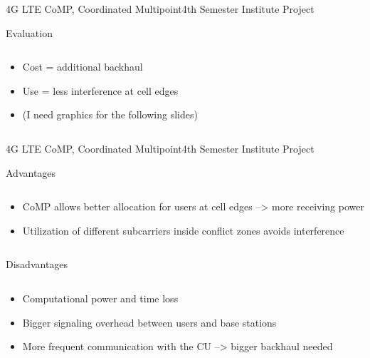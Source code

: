\documentclass[xcolor={cmyk}]{beamer}
\begin{document}
 \begin{frame}{4G LTE CoMP, Coordinated Multipoint}{4th Semester Institute Project}
	 \begin{block}{Evaluation}
	 	\begin{columns}
			\begin{column}{.9\textwidth}
				\begin{itemize}
					\item Cost = additional backhaul
					\item Use = less interference at cell edges
					\item (I need graphics for the following slides)
				\end{itemize}
			\end{column}
		\end{columns}
	 \end{block}
 \end{frame}
 
 \begin{frame}{4G LTE CoMP, Coordinated Multipoint}{4th Semester Institute Project}
	 \begin{block}{Advantages}
	 	\begin{columns}
			\begin{column}{.9\textwidth}
				\begin{itemize}
					\item CoMP allows better allocation for users at cell edges --> more receiving power
					\item Utilization of different subcarriers inside conflict zones avoids interference
				\end{itemize}
			\end{column}
		\end{columns}
	 \end{block}
	 \begin{block}{Disadvantages}
	 	\begin{columns}
			\begin{column}{.9\textwidth}
				\begin{itemize}
					\item Computational power and time loss
					\item Bigger signaling overhead between users and base stations
					\item More frequent communication with the CU --> bigger backhaul needed
				\end{itemize}
			\end{column}
		\end{columns}
	 \end{block}
 \end{frame}
\end{document}
